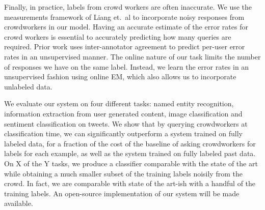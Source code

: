 
Finally, in practice, labels from crowd workers are often inaccurate.
We use the measurements framework of Liang et.\ al\cite{liang09measurements} to incorporate noisy responses from crowdworkers in our model.
Having an accurate estimate of the error rates for crowd workers is essential to accurately predicting how many queries are required.
Prior work uses inter-annotator agreement to predict per-user error rates in an unsupervised manner. 
The online nature of our task limits the number of responses we have on the same label.
Instead, we learn the error rates in an unsupervised fashion using online EM, which also allows us to incorporate unlabeled data.

We evaluate our system on four different tasks: named entity recognition, information extraction from user generated content, image classification and sentiment classification on tweets.
We show that by querying crowdworkers at classification time, we can significantly outperform a system trained on fully labeled data, for a fraction of the cost of the baseline of asking crowdworkers for labels for each example, as well as the system trained on fully labeled past data.
On X of the Y tasks, we produce a classifier comparable with the state of the art while obtaining a much smaller subset of the training labels noisily from the crowd. 
In fact, we are comparable with state of the art-ish with a handful of the training labels.
An open-source implementation of our system will be made available.

